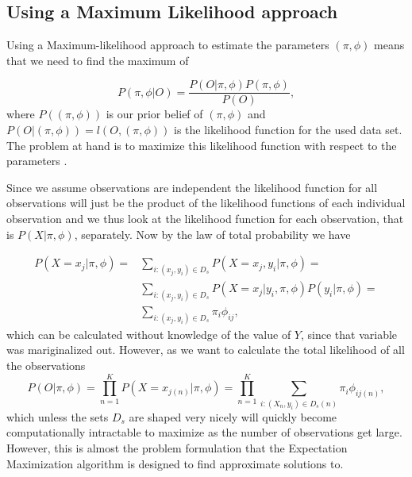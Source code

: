 \subsection{Using a Maximum Likelihood approach}
Using a Maximum-likelihood approach to estimate the parameters $(\pi, \phi)$ means that we need to find the maximum of

\begin{equation*}
P(\pi, \phi | O)=\frac{P(O | \pi, \phi)P(\pi, \phi)}{P(O)},
\end{equation*}
where $P((\pi, \phi))$ is our prior belief of $(\pi, \phi)$ and $P(O | (\pi, \phi)) = l(O,(\pi, \phi))$ is the likelihood function for the used data set. The problem at hand is to maximize this likelihood function with respect to the parameters .

Since we assume observations are independent the likelihood function for all observations will just be the product of the likelihood functions of each individual observation and we thus look at the likelihood function for each observation, that is $P(X | \pi, \phi)$, separately. Now by the law of total probability we have 

\begin{equation*}
\begin{split}
P(X=x_j | \pi, \phi) = &\sum_{i:(x_j,y_i)\in D_s}P(X=x_j,y_i | \pi, \phi) = \\
&\sum_{i:(x_j,y_i)\in D_s} P(X=x_j|y_i , \pi, \phi)P(y_i | \pi, \phi) = \\
&\sum_{i:(x_j,y_i)\in D_s}\pi_i\phi_{ij},
\end{split}
\end{equation*}
which can be calculated without knowledge of the value of $Y$, since that variable was mariginalized out. However, as we want to calculate the total likelihood of all the observations 
\begin{equation*}
P(O | \pi, \phi) = \prod_{n=1}^K P(X=x_{j(n)} |\pi, \phi) = \prod_{n=1}^K \sum_{i:(X_n,y_i)\in D_s(n)} \pi_i\phi_{ij(n)},
\end{equation*}
which unless the sets $D_s$ are shaped very nicely will quickly become computationally intractable to maximize as the number of observations get large. However, this is almost the problem formulation that the Expectation Maximization algorithm is designed to find approximate solutions to.

